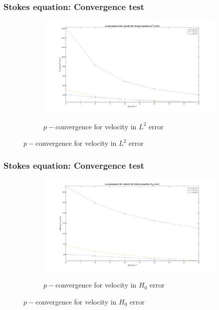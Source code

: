 \documentclass{beamer}
\begin{document}
\begin{frame}
\frametitle{Stokes equation: Convergence test}
\begin{figure}
\begin{subfigure}{0.9\textwidth}
\centering
  \includegraphics[width=0.9\linewidth]{p_conv_velocity_l2_stokes.jpg}
  \label{p_convergence_velocity_l2}
  \caption{$p-$convergence for velocity in $L^2$ error}
\end{subfigure}
\end{figure}
\end{frame}
\begin{frame}
\frametitle{Stokes equation: Convergence test}
\begin{figure}
\begin{subfigure}{0.9\textwidth}
\centering
  \includegraphics[width=0.9\linewidth]{p_conv_velocity_h0_stokes.jpg}
  \label{p_convergence_velocity_h0}
\caption{$p-$convergence for velocity in $H_0$ error}
\end{subfigure}
\end{figure}
\end{frame}
\end{document}
